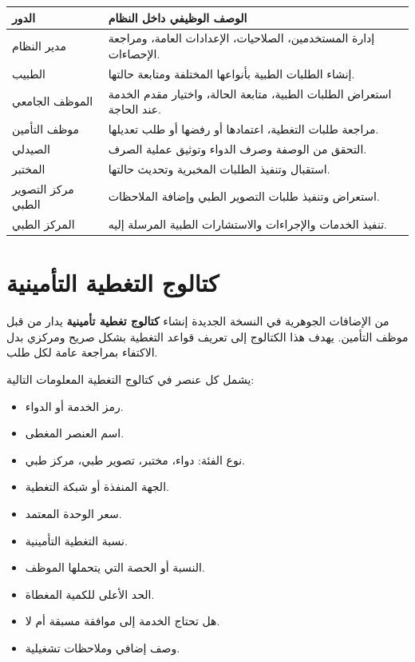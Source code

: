 \documentclass[12pt,a4paper]{report}
\begin{document}
\begin{longtable}{>{\raggedleft\arraybackslash}p{4cm} >{\raggedleft\arraybackslash}p{10cm}}
\toprule
\textbf{الدور} & \textbf{الوصف الوظيفي داخل النظام} \\
\midrule
\endhead
مدير النظام & إدارة المستخدمين، الصلاحيات، الإعدادات العامة، ومراجعة الإحصاءات. \\
الطبيب & إنشاء الطلبات الطبية بأنواعها المختلفة ومتابعة حالتها. \\
الموظف الجامعي & استعراض الطلبات الطبية، متابعة الحالة، واختيار مقدم الخدمة عند الحاجة. \\
موظف التأمين & مراجعة طلبات التغطية، اعتمادها أو رفضها أو طلب تعديلها. \\
الصيدلي & التحقق من الوصفة وصرف الدواء وتوثيق عملية الصرف. \\
المختبر & استقبال وتنفيذ الطلبات المخبرية وتحديث حالتها. \\
مركز التصوير الطبي & استعراض وتنفيذ طلبات التصوير الطبي وإضافة الملاحظات. \\
المركز الطبي & تنفيذ الخدمات والإجراءات والاستشارات الطبية المرسلة إليه. \\
\bottomrule
\end{longtable}

\section{كتالوج التغطية التأمينية}

من الإضافات الجوهرية في النسخة الجديدة إنشاء \textbf{كتالوج تغطية تأمينية} يدار من قبل موظف التأمين. يهدف هذا الكتالوج إلى تعريف قواعد التغطية بشكل صريح ومركزي بدل الاكتفاء بمراجعة عامة لكل طلب.

يشمل كل عنصر في كتالوج التغطية المعلومات التالية:

\begin{itemize}[itemsep=4pt]
  \item رمز الخدمة أو الدواء.
  \item اسم العنصر المغطى.
  \item نوع الفئة: دواء، مختبر، تصوير طبي، مركز طبي.
  \item الجهة المنفذة أو شبكة التغطية.
  \item سعر الوحدة المعتمد.
  \item نسبة التغطية التأمينية.
  \item النسبة أو الحصة التي يتحملها الموظف.
  \item الحد الأعلى للكمية المغطاة.
  \item هل تحتاج الخدمة إلى موافقة مسبقة أم لا.
  \item وصف إضافي وملاحظات تشغيلية.
\end{itemize}
\end{document}
